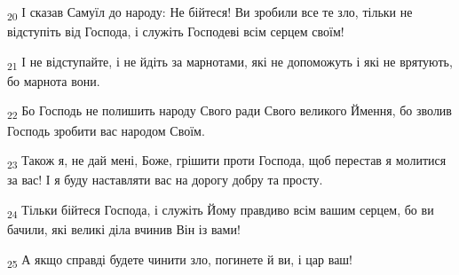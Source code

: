 \begin{tcolorbox}
\textsubscript{20} І сказав Самуїл до народу: Не бійтеся! Ви зробили все те зло, тільки не відступіть від Господа, і служіть Господеві всім серцем своїм!
\end{tcolorbox}
\begin{tcolorbox}
\textsubscript{21} І не відступайте, і не йдіть за марнотами, які не допоможуть і які не врятують, бо марнота вони.
\end{tcolorbox}
\begin{tcolorbox}
\textsubscript{22} Бо Господь не полишить народу Свого ради Свого великого Ймення, бо зволив Господь зробити вас народом Своїм.
\end{tcolorbox}
\begin{tcolorbox}
\textsubscript{23} Також я, не дай мені, Боже, грішити проти Господа, щоб перестав я молитися за вас! І я буду наставляти вас на дорогу добру та просту.
\end{tcolorbox}
\begin{tcolorbox}
\textsubscript{24} Тільки бійтеся Господа, і служіть Йому правдиво всім вашим серцем, бо ви бачили, які великі діла вчинив Він із вами!
\end{tcolorbox}
\begin{tcolorbox}
\textsubscript{25} А якщо справді будете чинити зло, погинете й ви, і цар ваш!
\end{tcolorbox}
